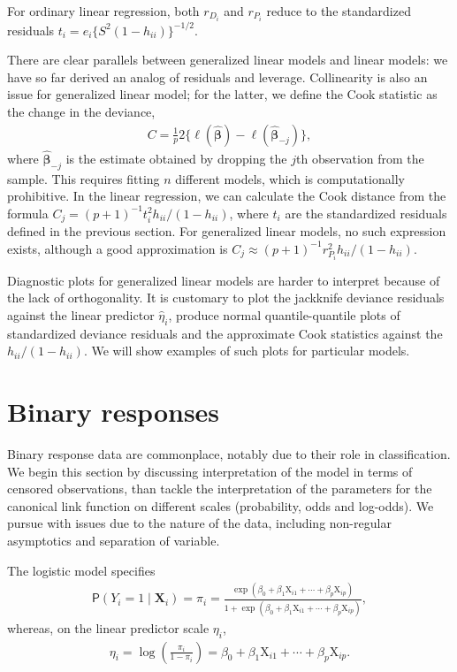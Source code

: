 \documentclass[
  11pt,
  letterpaper,
]{book}
\theoremstyle{definition}
\theoremstyle{definition}
\theoremstyle{definition}
\theoremstyle{remark}
\begin{document}
For ordinary linear regression, both \(r_{D_i}\) and \(r_{P_i}\) reduce to
the standardized residuals \(t_i=e_i\{S^2(1-h_{ii})\}^{-1/2}\).

There are clear parallels between generalized linear models and linear
models: we have so far derived an analog of residuals and leverage.
Collinearity is also an issue for generalized linear model; for the
latter, we define the Cook statistic as the change in the deviance,
\begin{align*}
C = \frac{1}{p} 2\{\ell(\widehat{\boldsymbol{\beta}}) - \ell(\widehat{\boldsymbol{\beta}}_{-j})\},
\end{align*}
where \(\widehat{\boldsymbol{\beta}}_{-j}\) is the estimate
obtained by dropping the \(j\)th observation from the sample. This
requires fitting \(n\) different models, which is computationally
prohibitive. In the linear regression, we can calculate the Cook
distance from the formula \(C_j = (p+1)^{-1}t_i^2h_{ii}/(1-h_{ii})\),
where \(t_i\) are the standardized residuals defined in the previous
section. For generalized linear models, no such expression exists,
although a good approximation is
\(C_j \approx (p+1)^{-1}r_{P_i}^2h_{ii}/(1-h_{ii})\).

Diagnostic plots for generalized linear models are harder to interpret
because of the lack of orthogonality. It is customary to plot the
jackknife deviance residuals against the linear predictor
\(\widehat{\eta}_i\), produce normal quantile-quantile plots of
standardized deviance residuals and the approximate Cook statistics
against the \(h_{ii}/(1-h_{ii})\). We will show examples of such plots for
particular models.

\hypertarget{binary-responses}{%
\section{Binary responses}\label{binary-responses}}

Binary response data are commonplace, notably due to their role in
classification. We begin this section by discussing interpretation of
the model in terms of censored observations, than tackle the
interpretation of the parameters for the canonical link function on
different scales (probability, odds and log-odds). We pursue with issues
due to the nature of the data, including non-regular asymptotics and
separation of variable.

The logistic model specifies
\begin{align*}
\mathsf{P}(Y_i=1 \mid \mathbf{X}_i) = \pi_i = \frac{\exp(\beta_0 + \beta_1 \mathrm{X}_{i1}+ \cdots + \beta_p\mathrm{X}_{ip})}{1 + \exp(\beta_0 + \beta_1 \mathrm{X}_{i1}+ \cdots + \beta_p\mathrm{X}_{ip})},
\end{align*}
whereas, on the linear predictor scale \(\eta_i\),
\begin{align*}
\eta_i =\log \left(\frac{\pi_i}{1-\pi_i}\right) =  \beta_0 + \beta_1 \mathrm{X}_{i1}+ \cdots + \beta_p\mathrm{X}_{ip}.
\end{align*}
\end{document}
